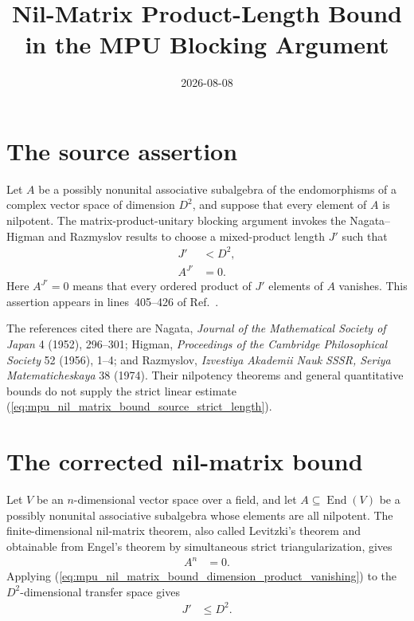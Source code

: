 \documentclass{article}
\title{Nil-Matrix Product-Length Bound in the MPU Blocking Argument}
\author{}
\date{2026-08-08}
\begin{document}
\maketitle
{}

\section{The source assertion}

Let $A$ be a possibly nonunital associative subalgebra of the endomorphisms of
a complex vector space of dimension $D^2$, and suppose that every element of
$A$ is nilpotent. The matrix-product-unitary blocking argument invokes the
Nagata--Higman and Razmyslov results to choose a mixed-product length $J'$
such that
\begin{align}
    J'
        &<D^2,
    \label{eq:mpu_nil_matrix_bound_source_strict_length}\\
    A^{J'}
        &=0.
    \label{eq:mpu_nil_matrix_bound_source_product_vanishing}
\end{align}
Here $A^{J'}=0$ means that every ordered product of $J'$ elements of $A$
vanishes. This assertion appears in lines~405--426 of
Ref.~\cite{Cirac2017MPU}.

The references cited there are Nagata, \emph{Journal of the Mathematical
Society of Japan} 4 (1952), 296--301; Higman, \emph{Proceedings of the
Cambridge Philosophical Society} 52 (1956), 1--4; and Razmyslov,
\emph{Izvestiya Akademii Nauk SSSR, Seriya Matematicheskaya} 38 (1974).
Their nilpotency theorems and general quantitative bounds do not supply the
strict linear estimate
(\ref{eq:mpu_nil_matrix_bound_source_strict_length}).

\section{The corrected nil-matrix bound}

Let $V$ be an $n$-dimensional vector space over a field, and let
$A\subseteq\operatorname{End}(V)$ be a possibly nonunital associative
subalgebra whose elements are all nilpotent. The finite-dimensional nil-matrix
theorem, also called Levitzki's theorem and obtainable from Engel's theorem by
simultaneous strict triangularization, gives
\begin{align}
    A^n
        &=0.
    \label{eq:mpu_nil_matrix_bound_dimension_product_vanishing}
\end{align}
Applying
(\ref{eq:mpu_nil_matrix_bound_dimension_product_vanishing}) to the
$D^2$-dimensional transfer space gives
\begin{align}
    J'
        &\leq D^2.
    \label{eq:mpu_nil_matrix_bound_corrected_transfer_length}
\end{align}
\end{document}
